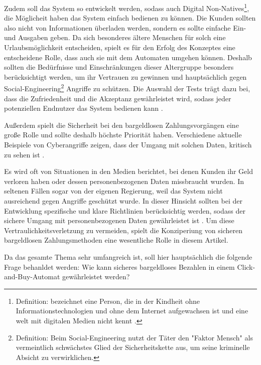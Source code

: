 Zudem soll das System so entwickelt werden, sodass auch Digital Non-Natives\footnote{Definition: bezeichnet
eine Person, die in der Kindheit ohne Informationstechnologien und ohne dem Internet aufgewachsen ist 
und eine welt mit digitalen Medien nicht kennt \cite{misc:MSND}.}, die Möglicheit \cite{refart:QWDN} haben
das System einfach bedienen zu können. Die Kunden sollten also nicht von Informationen überladen werden, 
sondern es sollte einfache Ein- und Ausgaben geben. Da sich besonderes ältere Menschen für solch eine 
Urlaubsmöglichkeit entscheiden, spielt es für den Erfolg des Konzeptes eine entscheidene Rolle, dass auch
sie mit dem Automaten umgehen können. Deshalb sollten die Bedürfnisse und Einschränkungen dieser Altergruppe
besonders berücksichtigt werden, um ihr Vertrauen zu gewinnen \cite{refart:HLAU} und hauptsächlich gegen
Social-Engineering\footnote{Definition: Beim Social-Engineering nutzt der Täter den "Faktor Mensch" als vermeintlich 
schwächstes Glied der Sicherheitskette aus, um seine kriminelle Absicht zu verwirklichen.\cite{booklet:BSSE}} 
Angriffe zu schützen. Die Auswahl der Tests trägt dazu bei, dass die Zufriedenheit und die Akzeptanz
gewährleistet wird, sodass jeder potenziellen Endnutzer das System bedienen kann \cite{refbook:IASE}.

Außerdem spielt die Sicherheit bei den bargeldlosen Zahlungsvorgängen eine große Rolle und sollte
deshalb höchste Priorität haben. Verschiedene aktuelle Beispiele von Cyberangriffe zeigen, dass der 
Umgang mit solchen Daten, kritisch zu sehen ist \cite{booklet:BKCB}. 

Es wird oft von Situationen in den Medien berichtet, bei denen Kunden ihr Geld verloren haben oder dessen
personenbezogenen Daten missbraucht wurden. In seltenen Fällen sogar von der eigenen Regierung, weil das System 
nicht ausreichend gegen Angriffe geschützt wurde. In dieser Hinsicht sollten bei der Entwicklung spezifische 
und klare Richtlinien berücksichtig werden, sodass der sichere Umgang mit personenbezogenen Daten gewährleistet ist 
\cite{refart:TRVR}. Um diese Vertraulichkeitsverletzung zu vermeiden, spielt die Konziperiung von sicheren 
bargeldlosen Zahlungsmethoden eine wesentliche Rolle in diesem Artikel. 

Da das gesamte Thema sehr umfangreich ist, soll hier hauptsächlich die folgende Frage behanldet werden: 
Wie kann sicheres bargeldloses Bezahlen in einem Click-and-Buy-Automat gewährleistet werden?